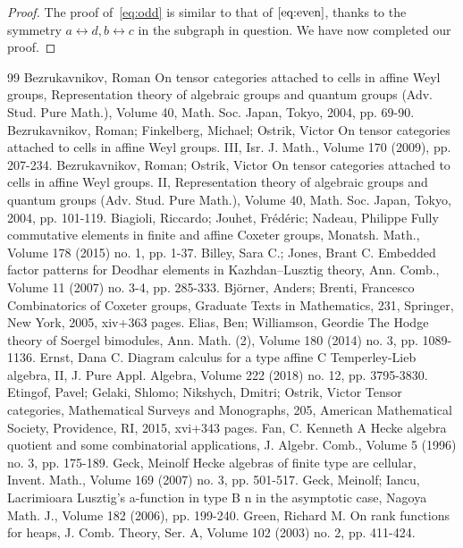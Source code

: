 \documentclass[10pt]{article}
\theoremstyle{definition}
\begin{document}
\begin{proof}
 The proof of~\eqref{eq:odd} is similar to that of $\eqref{eq:even}$,
 thanks to the symmetry $a\leftrightarrow d, b\leftrightarrow c$ in
 the subgraph in question. We have now completed our proof. 
 \end{proof}
\begin{thebibliography}{99}
 Bezrukavnikov, Roman On tensor categories attached to cells in affine Weyl groups, Representation theory of algebraic groups and quantum groups (Adv. Stud. Pure Math.), Volume 40, Math. Soc. Japan, Tokyo, 2004, pp. 69-90.
 Bezrukavnikov, Roman; Finkelberg, Michael; Ostrik, Victor On tensor categories attached to cells in affine Weyl groups. III, Isr. J. Math., Volume 170 (2009), pp. 207-234.
 Bezrukavnikov, Roman; Ostrik, Victor On tensor categories attached to cells in affine Weyl groups. II, Representation theory of algebraic groups and quantum groups (Adv. Stud. Pure Math.), Volume 40, Math. Soc. Japan, Tokyo, 2004, pp. 101-119.
 Biagioli, Riccardo; Jouhet, Frédéric; Nadeau, Philippe Fully commutative elements in finite and affine Coxeter groups, Monatsh. Math., Volume 178 (2015) no. 1, pp. 1-37.
 Billey, Sara C.; Jones, Brant C. Embedded factor patterns for Deodhar elements in Kazhdan–Lusztig theory, Ann. Comb., Volume 11 (2007) no. 3-4, pp. 285-333.
 Björner, Anders; Brenti, Francesco Combinatorics of Coxeter groups, Graduate Texts in Mathematics, 231, Springer, New York, 2005, xiv+363 pages.
 Elias, Ben; Williamson, Geordie The Hodge theory of Soergel bimodules, Ann. Math. (2), Volume 180 (2014) no. 3, pp. 1089-1136.
 Ernst, Dana C. Diagram calculus for a type affine C Temperley-Lieb algebra, II, J. Pure Appl. Algebra, Volume 222 (2018) no. 12, pp. 3795-3830.
 Etingof, Pavel; Gelaki, Shlomo; Nikshych, Dmitri; Ostrik, Victor Tensor categories, Mathematical Surveys and Monographs, 205, American Mathematical Society, Providence, RI, 2015, xvi+343 pages.
 Fan, C. Kenneth A Hecke algebra quotient and some combinatorial applications, J. Algebr. Comb., Volume 5 (1996) no. 3, pp. 175-189.
 Geck, Meinolf Hecke algebras of finite type are cellular, Invent. Math., Volume 169 (2007) no. 3, pp. 501-517.
 Geck, Meinolf; Iancu, Lacrimioara Lusztig’s a-function in type B n  in the asymptotic case, Nagoya Math. J., Volume 182 (2006), pp. 199-240.
 Green, Richard M. On rank functions for heaps, J. Comb. Theory, Ser. A, Volume 102 (2003) no. 2, pp. 411-424.

\end{thebibliography}
\end{document}
